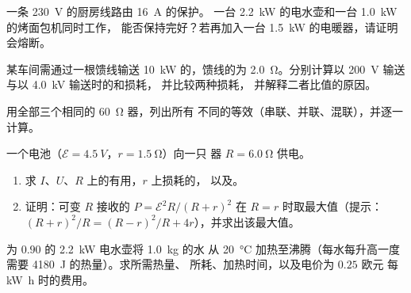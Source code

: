 \begin{exercise}[$\star\star$]\label{exo:g11:circuits-and-power:10}
一条 \qty{230}{V} 的厨房线路由 \qty{16}{A} 的保护。
一台 \qty{2.2}{kW} 的电水壶和一台 \qty{1.0}{kW} 的烤面包机同时工作，
能否保持完好？若再加入一台 \qty{1.5}{kW} 的电暖器，请证明会熔断。
\end{exercise}

\begin{exercise}[$\star\star$]\label{exo:g11:circuits-and-power:11}
某车间需通过一根馈线输送 \qty{10}{kW} 的，馈线的为
\qty{2.0}{\ohm}。分别计算以 \qty{200}{V} 输送与以 \qty{4.0}{kV} 输送时的和损耗，
并比较两种损耗，
并解释二者比值的原因。
\end{exercise}

\begin{exercise}[$\star\star\star$]\label{exo:g11:circuits-and-power:12}
用全部三个相同的 \qty{60}{\ohm} 器，列出所有
不同的等效（串联、并联、混联），并逐一计算。
\end{exercise}

\begin{exercise}[$\star\star\star$]\label{exo:g11:circuits-and-power:13}
一个电池（$\mathcal{E} = \qty{4.5}{V}$，$r = \qty{1.5}{\ohm}$）向一只
器 $R = \qty{6.0}{\ohm}$ 供电。
\begin{enumerate}
  \item 求 $I$、$U$、$R$ 上的有用，$r$ 上损耗的，
        以及。
  \item 证明：可变 $R$ 接收的
        $P = \mathcal{E}^2 R/(R+r)^2$ 在 $R = r$ 时取最大值（提示：
        $(R+r)^2/R = (R-r)^2/R + 4r$），并求出该最大值。
\end{enumerate}
\end{exercise}

\begin{exercise}[$\star\star\star$]\label{exo:g11:circuits-and-power:14}
为 $0.90$ 的 \qty{2.2}{kW} 电水壶将 \qty{1.0}{kg} 的水
从 \qty{20}{\degreeCelsius} 加热至沸腾（每水每升高一度需要
\qty{4180}{J} 的热量）。求所需热量、
所耗、加热时间，以及电价为 $0.25$ 欧元
每 \unit{kW.h} 时的费用。
\end{exercise}

